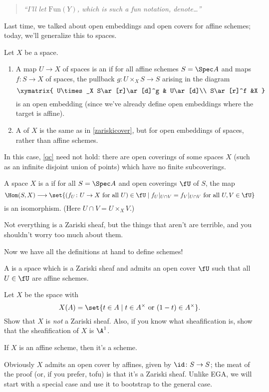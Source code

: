 \begin{quote}\textit{
	``I'll let $\mathrm{Fun}(Y)$, which is such a fun notation, denote\dots''
}\end{quote}
Last time, we talked about open embeddings and open covers for affine schemes; today, we'll generalize this to
spaces.
\begin{defn}
Let $X$ be a space.
\begin{enumerate}
	\item A map $U\to X$ of spaces is an  if for all affine schemes $S = \Spec A$ and maps
	$f\colon S\to X$ of spaces, the pullback $g\colon U\times_X S\to S$ arising in the diagram
	\[\xymatrix{
		U\times_X S\ar[r]\ar[d]^g & U\ar[d]\\
		S\ar[r]^f &X
	}\]
	is an open embedding (since we've already define open embeddings where the target is affine).
	\item A  of $X$ is the same as in \cref{zariskicover}, but for open embeddings of
	spaces, rather than affine schemes.
\end{enumerate}
\end{defn}
In this case, \cref{qc} need not hold: there are open coverings of some spaces $X$ (such as an infinite disjoint
union of points) which have no finite subcoverings.
\begin{defn}
A space $X$ is a  if for all $S = \Spec A$ and open coverings $\fU$ of $S$, the map
\[\Hom(S, X)\longrightarrow \set{(f_U\colon U\to X\text{ for all } U)\in\fU\mid f_U|_{U\cap V} = f_V|_{U\cap
V}\text{ for all } U,V\in\fU}\]
is an isomorphism. (Here $U\cap V = U\times_X V$.)
\end{defn}
Not everything is a Zariski sheaf, but the things that aren't are terrible, and you shouldn't worry too much about
them.

Now we have all the definitions at hand to define schemes!
\begin{defn}
A  is a space which is a Zariski sheaf and admits an open cover $\fU$ such that all $U\in\fU$ are
affine schemes.
\end{defn}
\begin{ex}
Let $X$ be the space with
\[X(A) = \set{t\in A\mid t\in A^\times\text{ or } (1-t)\in A^\times}.\]
Show that $X$ is \emph{not} a Zariski sheaf. Also, if you know what sheafification is, show that the sheafification
of $X$ is $\A^1$.
\end{ex}
\begin{prop}
\label{ASisS}
If $X$ is an affine scheme, then it's a scheme.
\end{prop}
Obviously $X$ admits an open cover by affines, given by $\id\colon S\to S$; the meat of the proof (or, if you
prefer, tofu) is that it's a Zariski sheaf. Unlike EGA, we will start with a special case and use it to bootstrap
to the general case.

